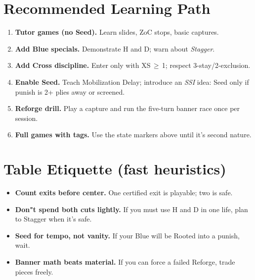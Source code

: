 \documentclass[11pt]{article}
\begin{document}
\section*{Recommended Learning Path}
\begin{enumerate}[label=\arabic*)]
  \item \textbf{Tutor games (no Seed).} Learn slides, ZoC stops, basic captures.
  \item \textbf{Add Blue specials.} Demonstrate H and D; warn about \emph{Stagger}.
  \item \textbf{Add Cross discipline.} Enter only with XS\,$\ge$\,1; respect 3-stay/2-exclusion.
  \item \textbf{Enable Seed.} Teach Mobilization Delay; introduce an \emph{SSI} idea: Seed only if punish is 2+ plies away or screened.
  \item \textbf{Reforge drill.} Play a capture and run the five-turn banner race once per session.
  \item \textbf{Full games with tags.} Use the state markers above until it's second nature.
\end{enumerate}

\section*{Table Etiquette (fast heuristics)}
\begin{itemize}
  \item \textbf{Count exits before center.} One certified exit is playable; two is safe.
  \item \textbf{Don"t spend both cuts lightly.} If you must use H and D in one life, plan to Stagger when it's safe.
  \item \textbf{Seed for tempo, not vanity.} If your Blue will be Rooted into a punish, wait.
  \item \textbf{Banner math beats material.} If you can force a failed Reforge, trade pieces freely.
\end{itemize}
\end{document}
